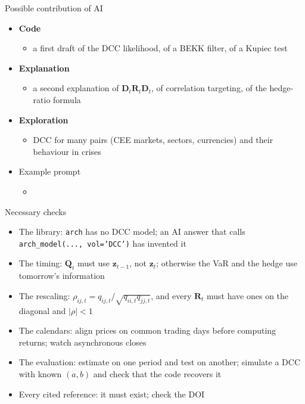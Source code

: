 \begin{frame}{Possible contribution of AI}
\itemsize{\small}
\begin{itemize}
    \item \textbf{Code}
    \begin{itemize}
        \item a first draft of the DCC likelihood, of a BEKK filter, of a Kupiec test
    \end{itemize}
    \item \textbf{Explanation}
    \begin{itemize}
        \item a second explanation of $\mathbf{D}_t\mathbf{R}_t\mathbf{D}_t$, of correlation targeting, of the hedge-ratio formula
    \end{itemize}
    \item \textbf{Exploration}
    \begin{itemize}
        \item DCC for many pairs (CEE markets, sectors, currencies) and their behaviour in crises
    \end{itemize}
    \item Example prompt
    \begin{itemize}
        \item {}
    \end{itemize}
\end{itemize}
\end{frame}

\begin{frame}{Necessary checks}
\itemsize{\small}
\begin{itemize}
    \item The library: \texttt{arch} has no DCC model; an AI answer that calls \texttt{arch\_model(..., vol='DCC')} has invented it
    \item The timing: $\mathbf{Q}_t$ must use $\mathbf{z}_{t-1}$, not $\mathbf{z}_t$; otherwise the VaR and the hedge use tomorrow's information
    \item The rescaling: $\rho_{ij,t} = q_{ij,t}/\sqrt{q_{ii,t}q_{jj,t}}$, and every $\mathbf{R}_t$ must have ones on the diagonal and $|\rho| < 1$
    \item The calendars: align prices on common trading days before computing returns; watch asynchronous closes
    \item The evaluation: estimate on one period and test on another; simulate a DCC with known $(a, b)$ and check that the code recovers it
    \item Every cited reference: it must exist; check the DOI
\end{itemize}
\end{frame}


